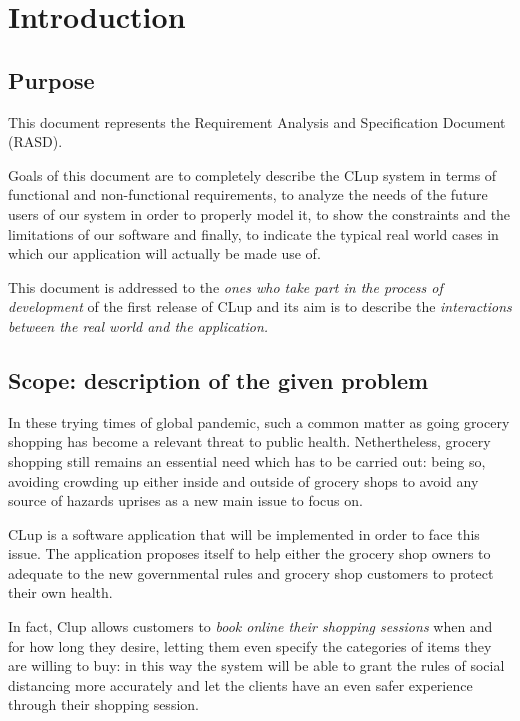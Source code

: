 \section{Introduction}
\label{sect:introduction}

\subsection{Purpose}
\label{subsect:purpose}

This document represents the Requirement Analysis and Specification Document (RASD). 

Goals of this document are to completely describe the CLup system in terms of functional and non-functional requirements, to analyze the needs of the future users of our system in order to properly model it, to show the constraints and the limitations of our software and finally, to indicate the typical real world cases in which our application will actually be made use of.

This document is addressed to the \textit{ones who take part in the process of development} of the first release of CLup and its aim is to describe the \textit{interactions between the real world and the application.}

\subsection{Scope: description of the given problem}
\label{subsect:scope}

In these trying times of global pandemic, such a common matter as going grocery shopping has become a relevant threat to public health. 
Nethertheless, grocery shopping still remains an essential need which has to be carried out: being so, avoiding crowding up either inside and outside of grocery shops to avoid any source of hazards uprises as a new main issue to focus on.

CLup is a software application that will be implemented in order to face this issue. The application proposes itself to help either the grocery shop owners to adequate to the new governmental rules and grocery shop customers to protect their own health.

In fact, Clup allows customers to \textit{book online their shopping sessions} when and for how long they desire, letting them even specify the categories of items they are willing to buy: in this way the system will be able to grant the rules of social distancing more accurately and let the clients have an even safer experience through their shopping session.

